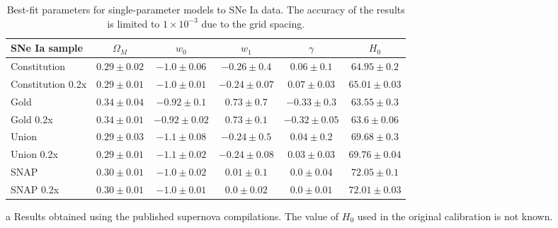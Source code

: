 \begin{table}
\centering

\begin{threeparttable}

\caption{
Best-fit parameters for single-parameter models to SNe Ia data.
The accuracy of the results is limited to $1\times10^{-3}$ due to
the grid spacing.
}
\label{tab:5.1}

\small

\begin{tabular}{@{}lccccc@{}}
\toprule

SNe Ia sample
&
$\Omega_M$
&
$w_0$
&
$w_1$
&
$\gamma$
&
$H_0$\tnote{c}
\\

\midrule

Constitution\tnote{a}
&
$0.29 \pm 0.02$
&
$-1.0 \pm 0.06$
&
$-0.26 \pm 0.4$
&
$0.06 \pm 0.1$
&
$64.95 \pm 0.2$
\\

Constitution 0.2x\tnote{a}
&
$0.29 \pm 0.01$
&
$-1.0 \pm 0.01$
&
$-0.24 \pm 0.07$
&
$0.07 \pm 0.03$
&
$65.01 \pm 0.03$
\\

Gold\tnote{a}
&
$0.34 \pm 0.04$
&
$-0.92 \pm 0.1$
&
$0.73 \pm 0.7$
&
$-0.33 \pm 0.3$
&
$63.55 \pm 0.3$
\\

Gold 0.2x\tnote{a}
&
$0.34 \pm 0.01$
&
$-0.92 \pm 0.02$
&
$0.73 \pm 0.1$
&
$-0.32 \pm 0.05$
&
$63.6 \pm 0.06$
\\

Union\tnote{a}
&
$0.29 \pm 0.03$
&
$-1.1 \pm 0.08$
&
$-0.24 \pm 0.5$
&
$0.04 \pm 0.2$
&
$69.68 \pm 0.3$
\\

Union 0.2x\tnote{a}
&
$0.29 \pm 0.01$
&
$-1.1 \pm 0.02$
&
$-0.24 \pm 0.08$
&
$0.03 \pm 0.03$
&
$69.76 \pm 0.04$
\\

SNAP\tnote{b}
&
$0.30 \pm 0.01$
&
$-1.0 \pm 0.02$
&
$0.01 \pm 0.1$
&
$0.0 \pm 0.04$
&
$72.05 \pm 0.1$
\\

SNAP 0.2x\tnote{b}
&
$0.30 \pm 0.01$
&
$-1.0 \pm 0.01$
&
$0.0 \pm 0.02$
&
$0.0 \pm 0.01$
&
$72.01 \pm 0.03$
\\

\bottomrule
\end{tabular}

\begin{tablenotes}
\footnotesize

\item[a]
Results obtained using the published supernova compilations.
The value of $H_0$ used in the original calibration is not known.


\end{tablenotes}
\end{threeparttable}
\end{table}
